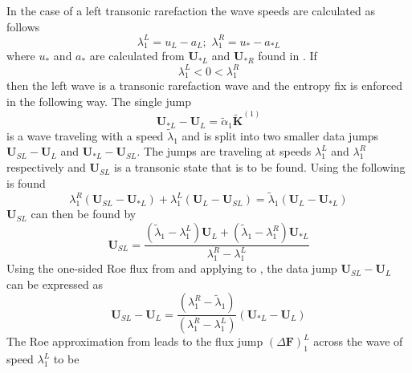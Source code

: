 In the case of a left transonic rarefaction the wave speeds are calculated as follows
\begin{equation}
	\lambda_1^L = u_L - a_L ; \, \, \lambda_1^R = u_* - a_{*L}
\end{equation}
where $u_*$ and $a_*$ are calculated from $\boldsymbol{U}_{*L}$ and $\boldsymbol{U}_{*R}$ found in . If
\begin{equation}
	\lambda_1^L < 0 < \lambda_1^R
\end{equation}
then the left wave is a transonic rarefaction wave and the entropy fix is enforced in the following way. The single jump
\begin{equation}\label{eqn:SingleJump1}
	\boldsymbol{U}_{*L} - \boldsymbol{U}_L = \tilde{\alpha}_1 \tilde{\boldsymbol{K}}^{(1)}
\end{equation}
is a wave traveling with a speed $\tilde{\lambda}_1$ and is split into two smaller data jumps $\boldsymbol{U}_{SL} - \boldsymbol{U}_L$ and $\boldsymbol{U}_{*L} - \boldsymbol{U}_{SL}$. The jumps are traveling at speeds $\lambda_1^L$ and $\lambda_1^R$ respectively and $\boldsymbol{U}_{SL}$ is a transonic state that is to be found. Using  the following is found
\begin{equation}\label{eq:IntegralEvaluated}
	\lambda_1^R \left(\boldsymbol{U}_{SL} - \boldsymbol{U}_{*L}\right) + \lambda_1^L \left(\boldsymbol{U}_{L} - \boldsymbol{U}_{SL}\right) = \tilde{\lambda}_1 \left(\boldsymbol{U}_{L} - \boldsymbol{U}_{*L}\right)
\end{equation}
$\boldsymbol{U}_{SL}$ can then be found by
\begin{equation}
	\boldsymbol{U}_{SL} = \frac{ \left( \tilde{\lambda}_1 - \lambda_1^L \right) \boldsymbol{U}_L + \left( \tilde{\lambda}_1 - \lambda_1^R \right) \boldsymbol{U}_{*L}}{\lambda_1^R - \lambda_1^L}
\end{equation}
Using the one-sided Roe flux from  and applying to , the data jump $\boldsymbol{U}_{SL} - \boldsymbol{U}_L$ can be expressed as
\begin{equation}
	\boldsymbol{U}_{SL} - \boldsymbol{U}_L = \frac{\left( \lambda_1^R - \tilde{\lambda}_1 \right)}{\left(\lambda_1^R - \lambda_1^L\right)} \left(\boldsymbol{U}_{*L} - \boldsymbol{U}_L\right)
\end{equation}
The Roe approximation from  leads to the flux jump $\left(\Delta \boldsymbol{F}\right)_1^L$ across the wave of speed $\lambda_1^L$ to be
